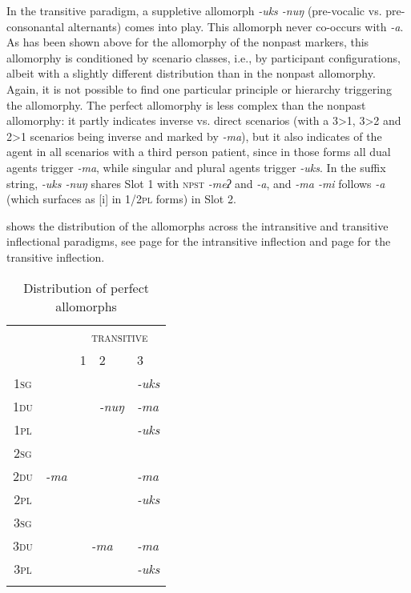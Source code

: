 In the transitive paradigm, a suppletive allomorph \emph{-uks \ti -nuŋ} (pre-vocalic vs. pre-consonantal alternants) comes into play. This allomorph never co-occurs with \emph{-a}. As has been shown above for the allomorphy of the nonpast markers, this allomorphy is conditioned by scenario classes, i.e., by participant configurations, albeit with a slightly different distribution than in the nonpast allomorphy. Again, it is  not possible to find one particular  principle or hierarchy triggering the allomorphy. The perfect allomorphy is less complex than the nonpast allomorphy: it partly indicates inverse vs. direct scenarios (with a 3>1, 3>2 and 2>1 scenarios being inverse and marked by \emph{-ma}), but it also indicates  of the agent in all scenarios with a third person patient, since in those forms all dual agents trigger \emph{-ma}, while singular and plural agents trigger \emph{-uks}. In the suffix string, \emph{-uks \ti -nuŋ} shares Slot 1 with {\scshape npst} \emph{-meʔ} and   \emph{-a}, and \emph{-ma \ti -mi} follows  \emph{-a} (which surfaces as [i] in {\scshape  1/2pl} forms)  in Slot 2.

 shows the distribution of the allomorphs across the intransitive and transitive inflectional paradigms, see  page \pageref{par-apma-pst} for the intransitive inflection and  page \pageref{par-chimd-prf} for the transitive inflection. 

\begin{table}
\begin{centering} 
\begin{tabular}{c|c|p{1.5cm}|p{1.5cm}|p{1.5cm}}
\lsptoprule
		& {\multirow{2}{*}{\scshape intransitive}}&	\multicolumn{3}{c}{ {\scshape transitive}}  \\
		&&	 {\scshape 1}&  {\scshape 2} & {\scshape  3} \\
\hline
 {\scshape 1sg} 		&& \cellcolor[gray]{.8}&&\it -uks \\
 \cline{1-1} \cline{5-5} 		
 {\scshape 1du}		& & \cellcolor[gray]{.8}&\it -nuŋ&\it -ma\\
 \cline{1-1} \cline{5-5} 			
 {\scshape 1pl}	&& \cellcolor[gray]{.8}&&\it -uks\\
 \cline{1-1}  \cline{3-4} 		
 {\scshape 2sg	}	& && \cellcolor[gray]{.8} &   \\
 \cline{1-1} \cline{5-5}			
 {\scshape 2du}	&\it -ma && \cellcolor[gray]{.8}  &\it -ma\\
 \cline{1-1} \cline{5-5}			
 {\scshape 2pl}	& && \cellcolor[gray]{.8}   &\it -uks\\
\cline{1-1}  \cline{4-4} 
 {\scshape 3sg}		&&\multicolumn{2}{c|}{}  & \\
  \cline{1-1}  \cline{5-5}					
 {\scshape 3du}&&\multicolumn{2}{c|}{\it -ma}  &\it -ma\\
 \cline{1-1} \cline{5-5}
 {\scshape 3pl}& &\multicolumn{2}{l|}{}  &\it -uks \\
\lspbottomrule
\end{tabular}
\caption{Distribution of perfect allomorphs}\label{par-prf-allo}
\end{centering}
\end{table}

